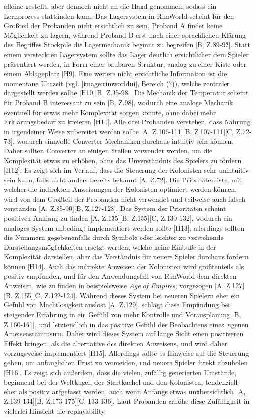 alleine gestellt, aber dennoch nicht an die Hand genommen, sodass ein Lernprozess stattfinden kann. Das Lagersystem in RimWorld scheint für den Großteil der Probanden nicht ersichtlich zu sein, Proband A findet keine Möglichkeit zu lagern, während Proband B erst nach einer sprachlichen Klärung des Begriffes \glqq Stockpile\grqq\; die Lagermechanik beginnt zu begreifen [B, Z.89-92]. Statt einem versteckten Lagersystem sollte das Lager deutlich ersichtlicher dem Spieler präsentiert werden, in Form einer baubaren Struktur, analog zu einer Kiste oder einem Ablageplatz [H9]. Eine weitere nicht ersichtliche Information ist die momentane Uhrzeit (vgl. \autoref{image:rimworldui}, Bereich (7)), welche zentraler dargestellt werden sollte [H10][B, Z.95-98]. Die Mechanik der Temperatur scheint für Proband B interessant zu sein [B, Z.98], wodurch eine analoge Mechanik eventuell für etwas mehr Komplexität sorgen könnte, ohne dabei mehr Erklärungsbedarf zu kreieren [H11]. Alle drei Probanden verstehen, dass Nahrung in irgendeiner Weise zubereitet werden sollte [A, Z.106-111][B, Z.107-111][C, Z.72-73], wodurch sinnvolle Converter-Mechaniken durchaus intuitiv sein können. Daher sollten Converter an einigen Stellen verwendet werden, um die Komplexität etwas zu erhöhen, ohne das Unverständnis des Spielers zu fördern [H12]. Es zeigt sich im Verlauf, dass die Steuerung der Kolonisten sehr unintuitiv sein kann, falls nicht anders bereits bekannt [A, Z.72]. Die Prioritätenliste, mit welcher die indirekten Anweisungen der Kolonisten optimiert werden können, wird von dem Großteil der Probanden nicht verwendet und teilweise auch falsch verstanden [A, Z.85-90][B, Z.127-128]. Das System der Prioritäten scheint positiven Anklang zu finden [A, Z.135][B, Z.155][C, Z.130-132], wodurch ein analoges System unbedingt implementiert werden sollte [H13], allerdings sollten die Nummern gegebenenfalls durch Symbole oder leichter zu verstehende Darstellungsmöglichkeiten ersetzt werden, welche keine Einbuße in der Komplexität darstellen, aber das Verständnis für neuere Spieler durchaus fördern können [H14]. Auch das indirekte Anweisen der Kolonisten wird größtenteils als positiv empfunden, und für den Anwendungsfall von RimWorld dem direkten Anweisen, wie zu finden in beispielsweise \textit{Age of Empires}, vorgezogen [A, Z.127][B, Z.155][C, Z.122-124]. Während dieses System bei neueren Spielern eher ein Gefühl von Machtlosigkeit auslöst [A, Z.129], schlägt diese Empfindung bei steigender Erfahrung in ein Gefühl von mehr Kontrolle und Vorausplanung [B, Z.160-161], und letztendlich in das positive Gefühl des Beobachtens eines eigenen \glqq Ameisenstamms\grqq [C, Z.123-124] um. Daher wird dieses System auf lange Sicht einen positiveren Effekt bringen, als die alternative des direkten Anweisens, und wird daher vorzugsweise implementiert [H15]. Allerdings sollte es Hinweise auf die Steuerung geben, um anfänglichen Frust zu vermeiden, und neuere Spieler direkt abzuholen [H16]. Es zeigt sich außerdem, dass die vielen, zufällig generierten Umstände, beginnend bei der Weltkugel, der Startkachel und den Kolonisten, tendenziell eher als positiv aufgefasst werden, auch wenn Anfangs etwas unübersichtlich [A, Z.139-134][B, Z.173-175][C, 133-136]. Laut Probanden erhöhe diese Zufälligkeit in vielerlei Hinsicht die replayability 